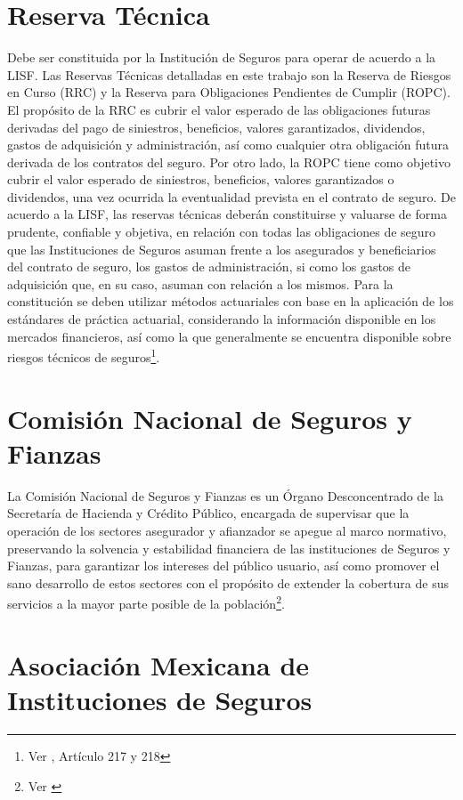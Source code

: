 \documentclass[11pt,twoside,openright,spanish]{report}
\numberwithin{equation}{chapter}
\numberwithin{figure}{chapter}
\numberwithin{table}{chapter}
\begin{document}
	\section{Reserva Técnica}

	Debe ser constituida por la Institución de Seguros para operar de acuerdo a la LISF. Las Reservas Técnicas detalladas en este trabajo son la Reserva de Riesgos en Curso (RRC) y la Reserva para Obligaciones Pendientes de Cumplir (ROPC). El propósito de la RRC es cubrir el valor esperado de las obligaciones futuras derivadas del pago de siniestros, beneficios, valores garantizados, dividendos, gastos de adquisición y administración, así como cualquier otra obligación futura derivada de los contratos del seguro. Por otro lado, la ROPC tiene como objetivo cubrir el valor esperado de siniestros, beneficios, valores garantizados o dividendos, una vez ocurrida la eventualidad prevista en el contrato de seguro. De acuerdo a la LISF, las reservas técnicas deberán constituirse y valuarse de forma prudente, confiable y objetiva, en relación con todas las obligaciones de seguro que las Instituciones de Seguros asuman frente a los asegurados y beneficiarios del contrato de seguro, los gastos de administración, si como los gastos de adquisición que, en su caso, asuman con relación a los mismos. Para la constitución se deben utilizar métodos actuariales con base en la aplicación de los estándares de práctica actuarial, considerando la información disponible en los mercados financieros, así como la que generalmente se encuentra disponible sobre riesgos técnicos de seguros\footnote{Ver \citet{DReservasTec}, Artículo 217 y 218}. 
	
	\section{Comisión Nacional de Seguros y Fianzas}

	La Comisión Nacional de Seguros y Fianzas es un Órgano Desconcentrado de la Secretaría de Hacienda y Crédito Público, encargada de supervisar que la operación de los sectores asegurador y afianzador se apegue al marco normativo, preservando la solvencia y estabilidad financiera de las instituciones de Seguros y Fianzas, para garantizar los intereses del público usuario, así como promover el sano desarrollo de estos sectores con el propósito de extender la cobertura de sus servicios a la mayor parte posible de la población\footnote{Ver \citet{EComision}}. 
	
	\section{Asociación Mexicana de Instituciones de Seguros}
	
\end{document}

